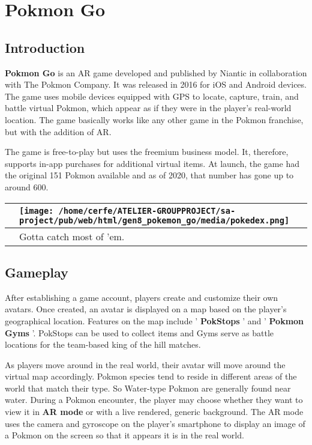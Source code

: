 \documentclass[a4paper,10pt]{book}
\begin{document}
 \section{Pokmon Go }
 \subsection{Introduction }
 
 \textbf{Pokmon Go }  is an AR game developed and published by Niantic in collaboration with The Pokmon Company. It was released in 2016 for iOS and Android devices.
          The game uses mobile devices equipped with GPS to locate, capture, train, and battle virtual Pokmon, which appear as if they were in the player's real-world location.
          The game basically works like any other game in the Pokmon franchise, but with the addition of AR.
           
          The game is free-to-play but uses the freemium business model. It, therefore, supports in-app purchases for additional virtual items.
          At launch, the game had the original 151 Pokmon available and as of 2020, that number has gone up to around 600.
         
 \begin{longtable}{p{1mm}|l|}\hline
 
 & \texttt{[image: /home/cerfe/ATELIER-GROUPPROJECT/sa-project/pub/web/html/gen8\_pokemon\_go/media/pokedex.png]}
 \\\hline
 
 & Gotta catch most of 'em. 
 \\\hline
 \end{longtable}
 \subsection{Gameplay }
 
        After establishing a game account, players create and customize their own avatars.
        Once created, an avatar is displayed on a map based on the player's geographical location. Features on the map include ' \textbf{PokStops } ' and ' \textbf{Pokmon Gyms } '.
        PokStops can be used to collect items and Gyms serve as battle locations for the team-based king of the hill matches.
       
 
        As players move around in the real world, their avatar will move around the virtual map accordingly.
        Pokmon species tend to reside in different areas of the world that match their type. So Water-type Pokmon are generally found near water.
        During a Pokmon encounter, the player may choose whether they want to view it in  \textbf{AR mode }  or with a live rendered, generic background.
        The AR mode uses the camera and gyroscope on the player's smartphone to display an image of a Pokmon on the screen so that it appears it is in the real world.
       
\end{document}
